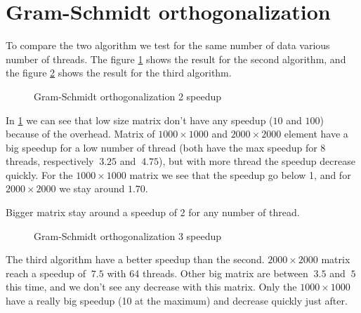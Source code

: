 \section{Gram-Schmidt orthogonalization}

To compare the two algorithm we test for the same number of data various number of threads. The figure \ref{fig:gram2} shows the result for the second algorithm, and the figure \ref{fig:gram3} shows the result for the third algorithm.\\

\begin{figure}[!h]
  \begin{center}
  \end{center}
  \caption{Gram-Schmidt orthogonalization 2 speedup}
  \label{fig:gram2}
\end{figure}

In \ref{fig:gram2} we can see that low size matrix don't have any speedup ($10$ and $100$) because of the overhead.
Matrix of $1000\times 1000$ and  $2000\times 2000$ element have a big speedup for a low number of thread (both have the max speedup for 8 threads, respectively $~3.25$ and $~4.75$), but with more thread the speedup decrease quickly. For the $1000\times 1000$ matrix we see that the speedup go below 1, and for $2000\times 2000$ we stay around $1.70$.

Bigger matrix stay around a speedup of 2 for any number of thread.\\

\begin{figure}[!h]
  \begin{center}
  \end{center}
  \caption{Gram-Schmidt orthogonalization 3 speedup}
  \label{fig:gram3}
\end{figure}

The third algorithm have a better speedup than the second.  $2000\times 2000$ matrix reach a speedup of $~7.5$ with 64 threads. Other big matrix are between $~3.5$ and $~5$ this time, and we don't see any decrease with this matrix. Only the $1000\times 1000$ have a really big speedup (10 at the maximum) and decrease quickly just after.
